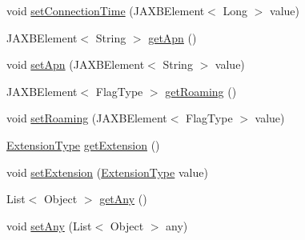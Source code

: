 \begin{DoxyCompactItemize}
\item 
void \hyperlink{classcom_1_1telefonica_1_1schemas_1_1unica_1_1rest_1_1directory_1_1v1_1_1UserAccessInfoType_a461b6bb6c303ceb46e388c98de845a59}{setConnectionTime} (JAXBElement$<$ Long $>$ value)
\item 
JAXBElement$<$ String $>$ \hyperlink{classcom_1_1telefonica_1_1schemas_1_1unica_1_1rest_1_1directory_1_1v1_1_1UserAccessInfoType_a7ca14005e93f154a6a92598bba7bf3b4}{getApn} ()
\item 
void \hyperlink{classcom_1_1telefonica_1_1schemas_1_1unica_1_1rest_1_1directory_1_1v1_1_1UserAccessInfoType_a4340a53616b3c60f7c61b572481b9dfd}{setApn} (JAXBElement$<$ String $>$ value)
\item 
JAXBElement$<$ FlagType $>$ \hyperlink{classcom_1_1telefonica_1_1schemas_1_1unica_1_1rest_1_1directory_1_1v1_1_1UserAccessInfoType_a3ba2bb77b2b9007d05cb6c75d866572a}{getRoaming} ()
\item 
void \hyperlink{classcom_1_1telefonica_1_1schemas_1_1unica_1_1rest_1_1directory_1_1v1_1_1UserAccessInfoType_af808f6792e0140409eca7be45df26ce9}{setRoaming} (JAXBElement$<$ FlagType $>$ value)
\item 
\hyperlink{classcom_1_1telefonica_1_1schemas_1_1unica_1_1rest_1_1common_1_1v1_1_1ExtensionType}{ExtensionType} \hyperlink{classcom_1_1telefonica_1_1schemas_1_1unica_1_1rest_1_1directory_1_1v1_1_1UserAccessInfoType_a8d0baa78dd60175a337c01e096bedfff}{getExtension} ()
\item 
void \hyperlink{classcom_1_1telefonica_1_1schemas_1_1unica_1_1rest_1_1directory_1_1v1_1_1UserAccessInfoType_ae6208f29d9a401ce9db26f832834983f}{setExtension} (\hyperlink{classcom_1_1telefonica_1_1schemas_1_1unica_1_1rest_1_1common_1_1v1_1_1ExtensionType}{ExtensionType} value)
\item 
List$<$ Object $>$ \hyperlink{classcom_1_1telefonica_1_1schemas_1_1unica_1_1rest_1_1directory_1_1v1_1_1UserAccessInfoType_af7601cd6f126d4fb84dbb7fa433363b3}{getAny} ()
\item 
void \hyperlink{classcom_1_1telefonica_1_1schemas_1_1unica_1_1rest_1_1directory_1_1v1_1_1UserAccessInfoType_a4e4e757f468be3b849222600b58197b5}{setAny} (List$<$ Object $>$ any)
\end{DoxyCompactItemize}
